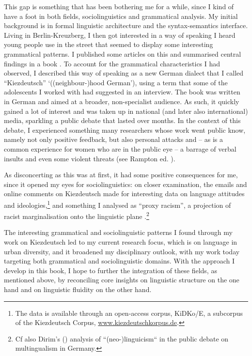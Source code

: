 This gap is something that has been bothering me for a while, since I kind of have a foot in both fields, sociolinguistics and grammatical analysis. My initial background is in formal linguistic architecture and the syntax-semantics interface. Living in Berlin-Kreuzberg, I then got interested in a way of speaking I heard young people use in the street that seemed to display some interesting grammatical patterns. I published some articles on this and summarised central findings in a book \citep{Wiese2012_kiezdeutsch}. To account for the grammatical characteristics I had observed, I described this way of speaking as a new German dialect that I called “Kiezdeutsch” ‘((neighbour-)hood German’), using a term that some of the adolescents I worked with had suggested in an interview. The book was written in German and aimed at a broader, non-specialist audience. As such, it quickly gained a lot of interest and was taken up in national (and later also international) media, sparkling a public debate that lasted over months. In the context of this debate, I experienced something many researchers whose work went public know, namely not only positive feedback, but also personal attacks and – as is a common experience for women who are in the public eye – a barrage of verbal insults and even some violent threats (see Rampton ed. \citeyear{Rampton2014}).

As disconcerting as this was at first, it had some positive consequences for me, since it opened my eyes for sociolinguistics: on closer examination, the emails and online comments on Kiezdeutsch made for interesting data on language attitudes and ideologies,\footnote{The data is available through an open-access corpus, KiDKo/E, a subcorpus of the Kiezdeutsch Corpus, \href{http://www.kiezdeutschkorpus.de}{{www.kiezdeutschkorpus.de}}.} and something I analysed as “proxy racism”, a projection of racist marginalisation onto the linguistic plane \citep{Wiese2015}.\footnote{Cf also Dirim's (\citeyear{Dirim2010}) analysis of “(neo-)linguicism“ in the public debate on multingualism in Germany.}

The interesting grammatical and sociolinguistic patterns I found through my work on Kiezdeutsch led to my current research focus, which is on language in urban diversity, and it broadened my disciplinary outlook, with my work today targeting both grammatical and sociolinguistic domains. With the approach I develop in this book, I hope to further the integration of these fields, as mentioned above, by reconciling core insights on linguistic structure on the one hand and on linguistic fluidity on the other hand. 

